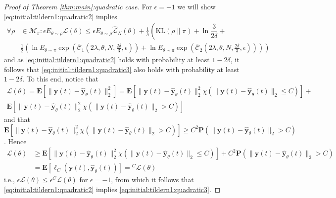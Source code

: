 \documentclass{article}
\newcommand{\KL}{\mathrm{KL}}
\renewcommand{\KL}{\mathrm{KL}}
\newcommand{\y}{\mathbf{y}}
\newcommand{\bP}{\mathbf{P}}
\newcommand{\bE}{\mathbf{E}}
\begin{document}
\begin{proof}[Proof of Theorem \ref{thm:main}:quadratic case]
  For $\epsilon=-1$
  we will show \eqref{eq:initial:tildern1:quadratic2} implies
\begin{equation}
        \label{eq:initial:tildern1:quadratic3} 
    \begin{aligned}
         \forall \rho & \in \mathcal{M}_\pi: \epsilon E_{\theta\sim\rho} \mathcal{L}(\theta)
         \leq   \epsilon E_{\theta\sim\rho} \hat{\mathcal{L}}_N(\theta) +  
          \frac{1}{\lambda}\left ( \KL(\rho\|\pi) + \ln\dfrac{3}{2\delta} + \right. \\
          &  \left. \frac{1}{2} 
          \left(\ln E_{\theta\sim\pi} \exp(\mathcal{\bar{C}}_1(2\lambda,\theta,N,\frac{2\delta}{3},\epsilon))+
          \ln E_{\theta \sim \pi} \exp(\mathcal{\bar{C}}_2(2\lambda,\theta,N,\frac{2\delta}{3},\epsilon))\right) \right)
    \end{aligned}
    \end{equation}
   and as \eqref{eq:initial:tildern1:quadratic2} holds with probability at least $1-2\delta$, it follows that \eqref{eq:initial:tildern1:quadratic3} also holds with probability at least $1-2\delta$. 
   To this end,   notice that 
    \begin{multline}
    \label{thm:main:quadratic:eq24}
        \mathcal{L}(\theta) = \bE{[\|\y(t)-\hat{\y}_{\theta}(t)\|_2^2]}= 
       \bE[\|\y(t)-\hat{\y}_{\theta}(t)\|_2^2\chi(\|\y(t)-\hat{\y}_{\theta}(t)\|_2 \le C)]+ \\
        \bE[\|\y(t)-\hat{\y}_{\theta}(t)\|_2^2\chi(\|\y(t)-\hat{\y}_{\theta}(t)\|_2 > C)]
    \end{multline}
    and that $\bE[\|\y(t)-\hat{\y}_{\theta}(t)\|_2^2\chi(\|\y(t)-\hat{\y}_{\theta}(t)\|_2 > C)] \ge C^2\bP(\|\y(t)-\hat{\y}_{\theta}(t)\|_2 > C)$. Hence
    \begin{equation}
    \label{thm:main:quadratic:eq210}
    \begin{aligned}
     \mathcal{L}(\theta)& 
    \ge  
         \bE[\|\y(t)-\hat{\y}_{\theta}(t)\|_2^2\chi(\|\y(t)-\hat{\y}_{\theta}(t)\|_2 \le C)]+ 
          C^2\bP(\|\y(t)-\hat{\y}_{\theta}(t)\|_2 > C)\\
          &= 
    \bE[\ell_C(\y(t),\hat{\y}_{\theta}(t))]={}^C \mathcal{L}(\theta)
    \end{aligned}
    \end{equation}
  i.e., $\epsilon \mathcal{L}(\theta) \le \epsilon {}^C \mathcal{L}(\theta)$
  for $\epsilon=-1$, from which it follows that \eqref{eq:initial:tildern1:quadratic2}
  implies \eqref{eq:initial:tildern1:quadratic3}.


\end{proof}
\end{document}
